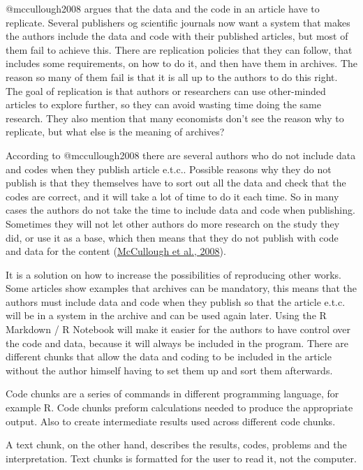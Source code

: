 \documentclass[
  12pt,
]{article}
\begin{document}
@mccullough2008 argues that the data and the code in an article have to
replicate. Several publishers og scientific journals now want a system
that makes the authors include the data and code with their published
articles, but most of them fail to achieve this. There are replication
policies that they can follow, that includes some requirements, on how
to do it, and then have them in archives. The reason so many of them
fail is that it is all up to the authors to do this right. The goal of
replication is that authors or researchers can use other-minded articles
to explore further, so they can avoid wasting time doing the same
research. They also mention that many economists don't see the reason
why to replicate, but what else is the meaning of archives?

According to @mccullough2008 there are several authors who do not
include data and codes when they publish article e.t.c.. Possible
reasons why they do not publish is that they themselves have to sort out
all the data and check that the codes are correct, and it will take a
lot of time to do it each time. So in many cases the authors do not take
the time to include data and code when publishing. Sometimes they will
not let other authors do more research on the study they did, or use it
as a base, which then means that they do not publish with code and data
for the content (\protect\hyperlink{ref-mccullough2008}{McCullough et
al., 2008}).

It is a solution on how to increase the possibilities of reproducing
other works. Some articles show examples that archives can be mandatory,
this means that the authors must include data and code when they publish
so that the article e.t.c. will be in a system in the archive and can be
used again later. Using the R Markdown / R Notebook will make it easier
for the authors to have control over the code and data, because it will
always be included in the program. There are different chunks that allow
the data and coding to be included in the article without the author
himself having to set them up and sort them afterwards.

Code chunks are a series of commands in different programming language,
for example R. Code chunks preform calculations needed to produce the
appropriate output. Also to create intermediate results used across
different code chunks.

A text chunk, on the other hand, describes the results, codes, problems
and the interpretation. Text chunks is formatted for the user to read
it, not the computer.
\end{document}
